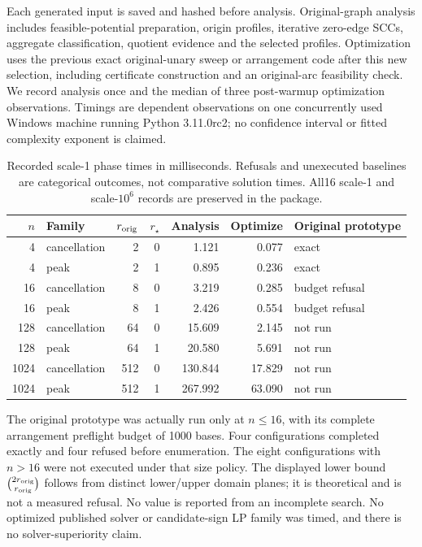Each generated input is saved and hashed before analysis. Original-graph
analysis includes feasible-potential preparation, origin profiles, iterative
zero-edge SCCs, aggregate classification, quotient evidence and the selected
profiles. Optimization uses the previous exact original-unary sweep or
arrangement code after this new selection, including certificate construction
and an original-arc feasibility check. We record analysis once and the median
of three post-warmup optimization observations. Timings are dependent observations
on one concurrently used Windows machine running Python 3.11.0rc2; no confidence
interval or fitted complexity exponent is claimed.

\begin{table}[ht]
\centering\small
\caption{Recorded scale-1 phase times in milliseconds. Refusals and unexecuted
baselines are categorical outcomes, not comparative solution times. All16
scale-1 and scale-$10^6$ records are preserved in the package.}
\begin{tabular}{rlrrrrl}
\toprule
$n$ & Family & $r_{\rm orig}$ & $r_\star$ & Analysis & Optimize & Original prototype\\
\midrule
4 & cancellation & 2 & 0 & 1.121 & 0.077 & exact \\
4 & peak & 2 & 1 & 0.895 & 0.236 & exact \\
16 & cancellation & 8 & 0 & 3.219 & 0.285 & budget refusal \\
16 & peak & 8 & 1 & 2.426 & 0.554 & budget refusal \\
128 & cancellation & 64 & 0 & 15.609 & 2.145 & not run \\
128 & peak & 64 & 1 & 20.580 & 5.691 & not run \\
1024 & cancellation & 512 & 0 & 130.844 & 17.829 & not run \\
1024 & peak & 512 & 1 & 267.992 & 63.090 & not run \\
\bottomrule
\end{tabular}
\end{table}

The original prototype was actually run only at $n\le16$, with its complete
arrangement preflight budget of 1000 bases. Four configurations completed
exactly and four refused before enumeration. The eight configurations with
$n>16$ were not executed under that size policy. The displayed lower bound
$\binom{2r_{\rm orig}}{r_{\rm orig}}$ follows from distinct lower/upper domain
planes; it is theoretical and is not a measured refusal. No value is reported
from an incomplete search. No optimized published solver or candidate-sign
LP family was timed, and there is no solver-superiority claim.

